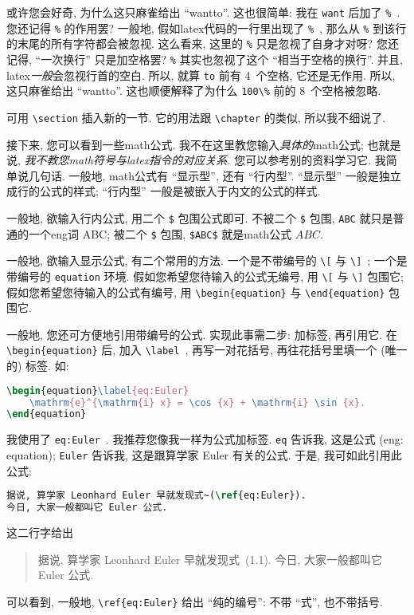 或许您会好奇, 为什么这只麻雀给出 ``wantto''.
这也很简单: 我在 \verb`want` 后加了 \verb`%`~.
您还记得 \verb`%` 的作用罢?
一般地, 假如\gls{latex}代码的一行里出现了 \verb`%`~,
那么从 \verb`%` 到该行的末尾的所有字符都会被忽视.
这么看来, 这里的 \verb`%` 只是忽视了自身才对呀?
您还记得, ``一次换行'' 只是加空格罢?
\verb`%` 其实也忽视了这个 ``相当于空格的换行''.
并且, \gls{latex}\emph{一般}会忽视行首的空白.
所以, 就算 \verb`to` 前有 4~个空格, 它还是无作用.
所以, 这只麻雀给出 ``wantto''.
这也顺便解释了为什么 \verb`100\%` 前的 8~个空格被忽略.

可用 \verb`\section` 插入新的一节.
它的用法跟 \verb`\chapter` 的类似, 所以我不细说了.

接下来, 您可以看到一些\gls{math}公式.
我不在这里教您输入\emph{具体的}\gls{math}公式;
也就是说,
\emph{我不教您\gls{math}符号与\gls{latex}指令的对应关系.}
您可以参考别的资料学习它.
我简单说几句话.
一般地, \gls{math}公式有 ``显示型'', 还有 ``行内型''.
``显示型'' 一般是独立成行的公式的样式;
``行内型'' 一般是被嵌入于内文的公式的样式.

一般地, 欲输入行内公式,
用二个 \verb`$` 包围公式即可.
不被二个 \verb`$` 包围,
\verb`ABC` 就只是普通的一个\gls{eng}词 ABC;
被二个 \verb`$` 包围,
\verb`$ABC$` 就是\gls{math}公式 $ABC$.

一般地, 欲输入显示公式, 有二个常用的方法.
一个是不带编号的 \verb`\[` 与 \verb`\]`~;
一个是带编号的 \verb`equation` 环境.
假如您希望您待输入的公式无编号,
用 \verb`\[` 与 \verb`\]` 包围它;
假如您希望您待输入的公式有编号,
用 \verb`\begin{equation}` 与 \verb`\end{equation}` 包围它.

一般地, 您还可方便地引用带编号的公式.
实现此事需二步: 加标签, 再引用它.
在 \verb`\begin{equation}` 后, 加入 \verb`\label`~,
再写一对花括号, 再往花括号里填一个 (唯一的) 标签.
如:
\begin{lstlisting}[language=TeX]
\begin{equation}\label{eq:Euler}
    \mathrm{e}^{\mathrm{i} x} = \cos {x} + \mathrm{i} \sin {x}.
\end{equation}
\end{lstlisting}
我使用了 \verb`eq:Euler`~.
我推荐您像我一样为公式加标签.
\verb`eq` 告诉我, 这是公式 (\gls{eng}: equation);
\verb`Euler` 告诉我, 这是跟算学家 Euler 有关的公式.
于是, 我可如此引用此公式:
\begin{lstlisting}[language=TeX]
据说, 算学家 Leonhard Euler 早就发现式~(\ref{eq:Euler}).
今日, 大家一般都叫它 Euler 公式.
\end{lstlisting}
这二行字给出
\begin{quotation}
    据说, 算学家 Leonhard Euler 早就发现式~(1.1).
    今日, 大家一般都叫它 Euler 公式.
\end{quotation}
可以看到, 一般地,
\verb`\ref{eq:Euler}` 给出 ``纯的编号'':
不带 ``式'', 也不带括号.

